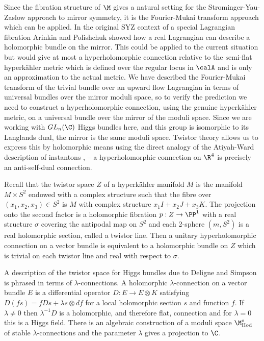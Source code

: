 Since the fibration structure of $\M$ gives a natural setting for the Strominger-Yau-Zaslow approach to mirror symmetry, it is the Fourier-Mukai transform approach which can be applied. In the original SYZ context of a special Lagrangian fibration Arinkin and Polishchuk \cite{arinkin} showed how a real Lagrangian can describe a holomorphic bundle on the mirror. This could be applied to the current situation but would give at most  a hyperholomorphic connection relative to the {\emph semi-flat} hyperk\"ahler metric which is defined over the regular locus in $ \calA$ and is only an approximation to the actual metric. We have described the Fourier-Mukai transform of the trivial bundle over an upward flow Lagrangian in terms of universal bundles over the mirror moduli space, so to verify the prediction we need to construct a hyperholomorphic connection, using the genuine hyperk\"ahler metric, on a universal bundle  over the mirror of the moduli space. Since we are working with $GL_n(\C)$ Higgs bundles here, and this group is isomorphic to its Langlands dual, the mirror is the same moduli space. Twistor theory allows us to express this by holomorphic means using the direct analogy of the Atiyah-Ward description of instantons \cite{AHS}, \cite{Sal} -- a hyperholomorphic connection on $\R^4$ is precisely an  anti-self-dual connection.

Recall that the twistor space $Z$ of a hyperk\"ahler manifold $M$ is  the manifold $M\times S^2$ endowed with a complex structure such that the fibre over $(x_1,x_2,x_3)\in S^2$ is $M$ with complex structure $x_1I+x_2J+x_3K$. The projection onto the second factor is a holomorphic fibration $p: Z\rightarrow \PP^1$ with a real structure $\sigma$ covering the antipodal map on $S^2$ and each 2-sphere $(m,S^2)$ is a real holomorphic section, called a twistor line.   Then a unitary hyperholomorphic connection on a vector bundle is equivalent to a holomorphic bundle on $Z$ which is trivial on each twistor line and real with respect to $\sigma$.

A description of the twistor space for Higgs bundles due to Deligne and Simpson \cite{simpson3} is phrased in terms of $\lambda$-connections. A holomorphic $\lambda$-connection on a vector bundle $E$ is a differential operator $D:E\rightarrow E\otimes K$ satisfying
$D(fs)=fDs+\lambda s\otimes df$ for a local holomorphic section $s$ and function $f$. If $\lambda\ne 0$ then $\lambda^{-1}D$ is a holomorphic, and therefore flat, connection and for $\lambda=0$ this is a Higgs field. There is an algebraic construction of a moduli space ${\M}^s_{\mathrm{Hod}}$ of stable $\lambda$-connections and the parameter $\lambda$ gives a projection to $\C$.

